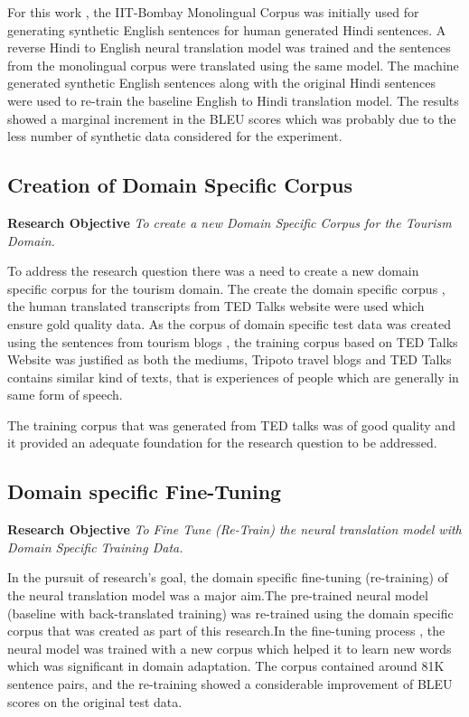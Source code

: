 For this work , the IIT-Bombay Monolingual Corpus was initially used for generating synthetic English sentences for human generated Hindi sentences. A reverse Hindi to English neural translation model was trained and the sentences from the monolingual corpus were translated using the same model. The machine generated synthetic English sentences along with the original Hindi sentences were used to re-train the baseline English to Hindi translation model. The results showed a marginal increment in the BLEU scores which was probably due to the less number of synthetic data considered for the experiment.

\subsection{Creation of Domain Specific Corpus}
\textbf{Research Objective} \textit{To create a new Domain Specific Corpus for the Tourism Domain.}

To address the research question there was a need to create a new domain specific corpus for the tourism domain. The create the domain specific corpus , the human translated transcripts from TED Talks website were used which ensure gold quality data. As the corpus of domain specific test data was created using the sentences from tourism blogs , the training corpus based on TED Talks Website was justified as both the mediums, Tripoto travel blogs and TED Talks contains similar kind of texts, that is experiences of people which are generally in same form of speech. 

The training corpus that was generated from TED talks was of good quality and it provided an adequate foundation for the research question to be addressed.  

\subsection{Domain specific Fine-Tuning}
\textbf{Research Objective} \textit{To Fine Tune (Re-Train) the neural translation model with Domain Specific Training Data.
}

In the pursuit of research's goal, the domain specific fine-tuning (re-training) of the neural translation model was a major aim.The pre-trained neural model (baseline with back-translated training) was re-trained using the domain specific corpus that was created as part of this research.In the fine-tuning process , the neural model was trained with a new corpus which helped it to learn new words which was significant in domain adaptation. The corpus contained around 81K sentence pairs, and the re-training showed a considerable improvement of BLEU scores on the original test data. 


